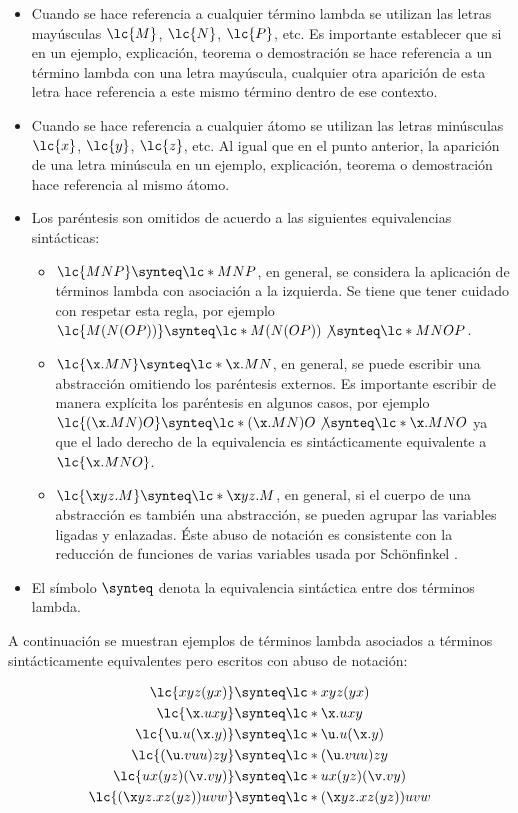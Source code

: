 \begin{itemize}
\item Cuando se hace referencia a cualquier término lambda se utilizan las
  letras mayúsculas \(\lc{M}\), \(\lc{N}\), \(\lc{P}\), etc. Es importante
  establecer que si en un ejemplo, explicación, teorema o demostración se hace
  referencia a un término lambda con una letra mayúscula, cualquier otra
  aparición de esta letra hace referencia a este mismo término dentro de ese
  contexto.
\item Cuando se hace referencia a cualquier átomo se utilizan las letras
  minúsculas \(\lc{x}\), \(\lc{y}\), \(\lc{z}\), etc. Al igual que en el punto
  anterior, la aparición de una letra minúscula en un ejemplo, explicación,
  teorema o demostración hace referencia al mismo átomo.
\item Los paréntesis son omitidos de acuerdo a las siguientes equivalencias
  sintácticas:
  \begin{itemize}
  \item \(\lc{M N P} \synteq \lc*{M N P}\), en general, se considera la
    aplicación de términos lambda con asociación a la izquierda. Se tiene que
    tener cuidado con respetar esta regla, por ejemplo \(\lc{M(N(O
      P))} \synteq \lc*{M(N(O P))} \not\synteq \lc*{M N O P}\).
  \item \(\lc{\x.M N} \synteq \lc*{\x.M N}\), en general, se puede escribir una
    abstracción omitiendo los paréntesis externos. Es importante escribir de
    manera explícita los paréntesis en algunos casos, por ejemplo \(\lc{(\x.M N) O} \synteq
    \lc*{(\x.M N) O} \not\synteq \lc*{\x.M N O}\) ya que el lado derecho de la
    equivalencia es sintácticamente equivalente a \(\lc{\x.M N O}\).
  \item \(\lc{\x y z.M} \synteq \lc*{\x y z.M}\), en general, si el cuerpo de
    una abstracción es también una abstracción, se pueden agrupar las variables
    ligadas y enlazadas. Éste abuso de notación es consistente con la reducción
    de funciones de varias variables usada por Schönfinkel \cite{Schonfinkel:Varargs}.
  \end{itemize}
\item El símbolo \(\synteq\) denota la equivalencia sintáctica entre dos
  términos lambda.
\end{itemize}

A continuación se muestran ejemplos de términos lambda asociados a términos
sintácticamente equivalentes pero escritos con abuso de notación:

\begin{align*}
  \lc{x y z (y x)} & \synteq \lc*{x y z (y x)}\\
  \lc{\x.u x y} & \synteq \lc*{\x.u x y}\\
  \lc{\u.u(\x.y)} & \synteq \lc*{\u.u(\x.y)}\\
  \lc{(\u.v u u)z y} & \synteq \lc*{(\u.v u u)z y}\\
  \lc{u x(y z)(\v.v y)} & \synteq \lc*{u x(y z)(\v.v y)}\\
  \lc{(\x y z.x z(y z))u v w} & \synteq \lc*{(\x y z.x z(y z))u v w}
\end{align*}


